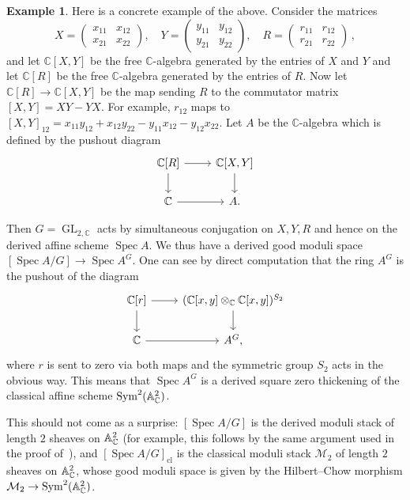\documentclass[a4paper,twoside,11pt]{amsart}
\theoremstyle{plain}
\theoremstyle{definition}
\newtheorem{example}[theorem]{Example}
\theoremstyle{remark}
\numberwithin{equation}{section}
\newcommand{\CC}{\mathbb{C}} %
\DeclareMathOperator{\Sym}{Sym} %
\DeclareMathOperator{\Spec}{Spec} %
\newcommand{\cl}{\mathrm{cl}} %
\DeclareMathOperator{\GL}{GL}
\newcommand{\mM}{\mathcal{M}}
\begin{document}
\begin{example} \label{example:moduli of sheaves} Here is a concrete example of the above. Consider the matrices
        \[
            X = \begin{pmatrix}
                x_{11} & x_{12} \\
                x_{21} & x_{22}
            \end{pmatrix}, \quad
            Y = \begin{pmatrix}
                y_{11} & y_{12} \\
                y_{21} & y_{22}
            \end{pmatrix}, \quad
            R = \begin{pmatrix}
                r_{11} & r_{12} \\
                r_{21} & r_{22}
            \end{pmatrix}\,,
        \]
    and let $\CC[X,Y]$ be the free $\CC$-algebra generated by the entries of $X$ and $Y$ and let $\CC[R]$ be the free $\CC$-algebra generated by the entries of $R$. Now let $\CC[R]\to \CC[X,Y]$ be the map sending $R$ to the commutator matrix $[X,Y] = XY-YX$. For example, $r_{12}$ maps to $[X,Y]_{12} = x_{11} y_{12} + x_{12} y_{22} - y_{11} x_{12} - y_{12} x_{22}$. Let $A$ be the $\CC$-algebra which is defined by the pushout diagram 
        \[
            \begin{tikzcd}
                \CC[R] \ar{d}\ar{r} & \CC[X,Y] \ar{d} \\
                \CC \ar{r} & A.
            \end{tikzcd}
        \]
        
    Then $G=\GL_{2,\CC}$ acts by simultaneous conjugation on $X,Y, R$ and hence on the derived affine scheme $\Spec A$. We thus have a derived good moduli space $[\Spec A/G]\to \Spec A^G$. One can see by direct computation that the ring $A^G$ is the pushout of the diagram  
        \[
            \begin{tikzcd}
                \CC[r] \ar{d}\ar{r} & (\CC[x,y]\otimes_{\CC} \CC[x,y])^{S_2} \ar{d}\\
                \CC \ar{r} & A^G,
            \end{tikzcd}
        \]
    where $r$ is sent to zero via both maps and the symmetric group $S_2$ acts in the obvious way. This means that $\Spec A^G$ is a derived square zero thickening of the classical affine scheme $\Sym^2(\AA^2_\CC)$. 
    
    This should not come as a surprise: $[\Spec A / G]$ is the derived moduli stack of length $2$ sheaves on $\AA^2_\CC$ (for example, this follows by the same argument used in the proof of~\cite[Theorem~9]{KatzShi}), and $[\Spec A / G]_\cl$ is the classical moduli stack $\mM_2$ of length $2$ sheaves on $\AA^2_\CC$, whose good moduli space is given by the Hilbert--Chow morphism $\mM_2 \to \Sym^2(\AA^2_\CC)$.
\end{example}
\end{document}
